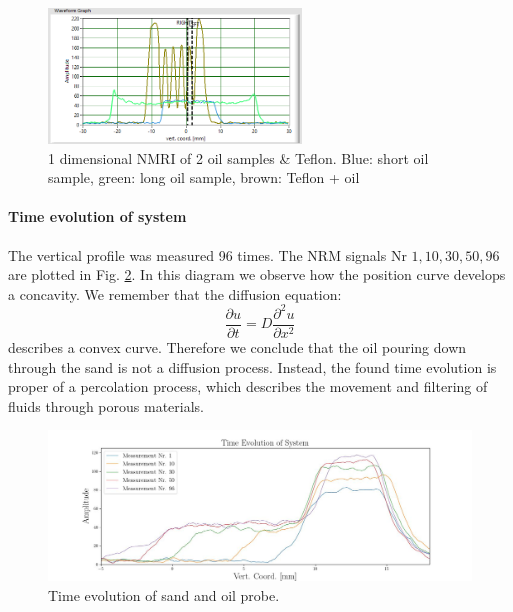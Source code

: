 \begin{figure}[!htbp]
  \begin{center}
    \includegraphics[width= 0.6\textwidth]{./Protocol images/III/three_profiles.png}
 \caption{1 dimensional NMRI of 2 oil samples \& Teflon. Blue: short oil sample, green: long oil sample, brown: Teflon + oil}
    \label{fig:teflon}
   \end{center}
 \end{figure} 
\paragraph{Time evolution of system}
The vertical profile was measured 96 times. The NRM signals Nr $ 1,10, 30, 50, 96$ are plotted in Fig. \ref{fig:time evolution system}. In this diagram we observe how the position curve develops a concavity. We remember that the diffusion equation:
\begin{equation}
\frac{\partial u}{\partial t} = D\frac{\partial^2 u}{\partial x^2}
\end{equation}
describes a convex curve. Therefore we conclude that the oil pouring down through the sand is not a diffusion process. Instead, the found time evolution is proper of a percolation process, which describes the movement and filtering of fluids through porous materials. 
\begin{figure}[!htbp]
  \begin{center}
    \includegraphics[width= 1.0\textwidth]{./Latex images/time_evolution.jpg}
 \caption{Time evolution of sand and oil probe.}
    \label{fig:time evolution system}
   \end{center}
 \end{figure}
